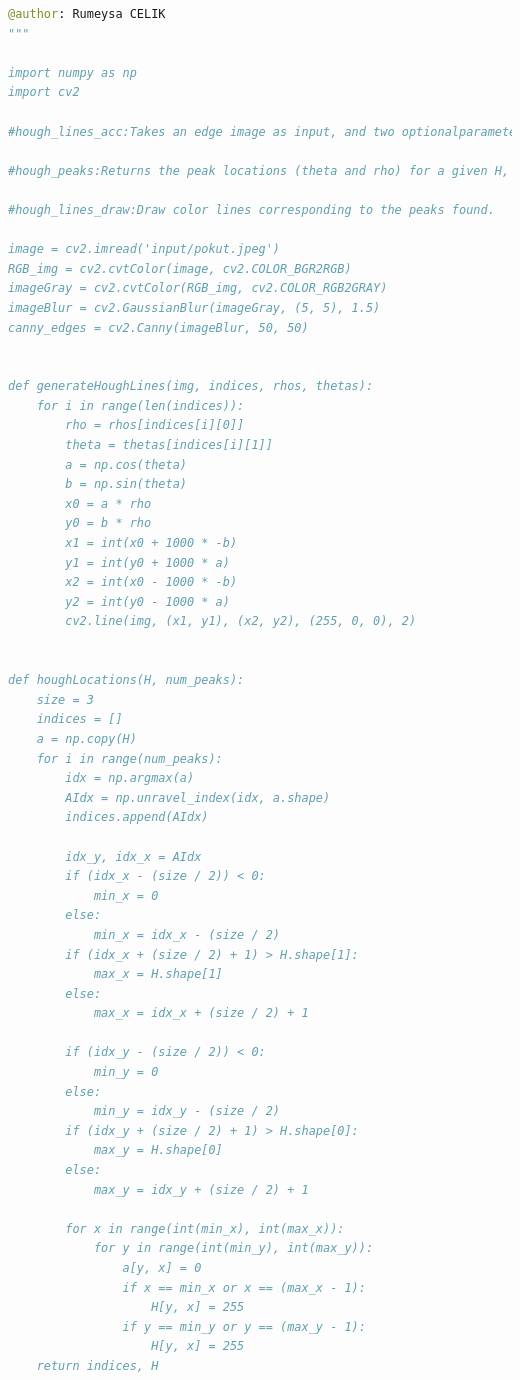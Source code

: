 \documentclass[a4paper, 12pt]{report}
\begin{document}
{{\begin{lstlisting}[language=Python]
@author: Rumeysa CELIK
"""

import numpy as np
import cv2

#hough_lines_acc:Takes an edge image as input, and two optionalparameters ThetaResolutionand RhoResolution, which indicates the cell size for theta and rho parameters.Returns an accumulator matrix H, and cell locations thetaand rho.

#hough_peaks:Returns the peak locations (theta and rho) for a given H, theta, and rhoarrays. The function also should take a threshold value tto eliminate weak peaks that are less than t, and another parameter sto return the strongest s peaks.

#hough_lines_draw:Draw color lines corresponding to the peaks found.

image = cv2.imread('input/pokut.jpeg')
RGB_img = cv2.cvtColor(image, cv2.COLOR_BGR2RGB)
imageGray = cv2.cvtColor(RGB_img, cv2.COLOR_RGB2GRAY)
imageBlur = cv2.GaussianBlur(imageGray, (5, 5), 1.5)
canny_edges = cv2.Canny(imageBlur, 50, 50)


def generateHoughLines(img, indices, rhos, thetas):
    for i in range(len(indices)):
        rho = rhos[indices[i][0]]
        theta = thetas[indices[i][1]]
        a = np.cos(theta)
        b = np.sin(theta)
        x0 = a * rho
        y0 = b * rho
        x1 = int(x0 + 1000 * -b)
        y1 = int(y0 + 1000 * a)
        x2 = int(x0 - 1000 * -b)
        y2 = int(y0 - 1000 * a)
        cv2.line(img, (x1, y1), (x2, y2), (255, 0, 0), 2)


def houghLocations(H, num_peaks):
    size = 3
    indices = []
    a = np.copy(H)
    for i in range(num_peaks):
        idx = np.argmax(a)
        AIdx = np.unravel_index(idx, a.shape)
        indices.append(AIdx)

        idx_y, idx_x = AIdx
        if (idx_x - (size / 2)) < 0:
            min_x = 0
        else:
            min_x = idx_x - (size / 2)
        if (idx_x + (size / 2) + 1) > H.shape[1]:
            max_x = H.shape[1]
        else:
            max_x = idx_x + (size / 2) + 1

        if (idx_y - (size / 2)) < 0:
            min_y = 0
        else:
            min_y = idx_y - (size / 2)
        if (idx_y + (size / 2) + 1) > H.shape[0]:
            max_y = H.shape[0]
        else:
            max_y = idx_y + (size / 2) + 1

        for x in range(int(min_x), int(max_x)):
            for y in range(int(min_y), int(max_y)):
                a[y, x] = 0
                if x == min_x or x == (max_x - 1):
                    H[y, x] = 255
                if y == min_y or y == (max_y - 1):
                    H[y, x] = 255
    return indices, H



\end{lstlisting}}}
\end{document}
